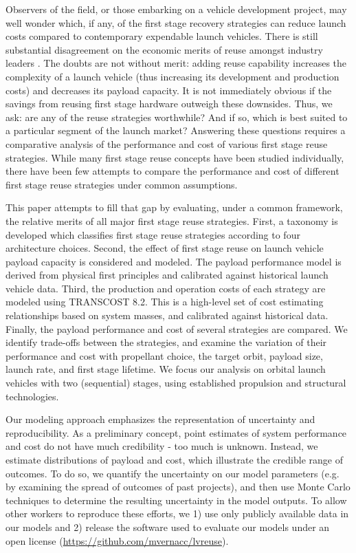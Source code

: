 \documentclass[conf]{new-aiaa}
\begin{document}
\begin{multicols}{2}
Observers of the field, or those embarking on a vehicle development project, may well wonder which, if any, of the first stage recovery strategies can reduce launch costs compared to contemporary expendable launch vehicles. There is still substantial disagreement on the economic merits of reuse amongst industry leaders \cite{Cantrell17, Russell18, Selding16_orbital, Wall15, Selding16_spacex}. The doubts are not without merit: adding reuse capability increases the complexity of a launch vehicle (thus increasing its development and production costs) and decreases its payload capacity. It is not immediately obvious if the savings from reusing first stage hardware outweigh these downsides. Thus, we ask: are any of the reuse strategies worthwhile? And if so, which is best suited to a particular segment of the launch market? Answering these questions requires a comparative analysis of the performance and cost of various first stage reuse strategies. While many first stage reuse concepts have been studied individually, there have been few attempts to compare the performance and cost of different first stage reuse strategies under common assumptions.

This paper attempts to fill that gap by evaluating, under a common framework, the relative merits of all major first stage reuse strategies. First, a taxonomy is developed which classifies first stage reuse strategies according to four architecture choices. Second, the effect of first stage reuse on launch vehicle payload capacity is considered and modeled. The payload performance model is derived from physical first principles and calibrated against historical launch vehicle data. Third, the production and operation costs of each strategy are modeled using TRANSCOST 8.2. This is a high-level set of cost estimating relationships based on system masses, and calibrated against historical data. Finally, the payload performance and cost of several strategies are compared. We identify trade-offs between the strategies, and examine the variation of their performance and cost with propellant choice, the target orbit, payload size, launch rate, and first stage lifetime. We focus our analysis on orbital launch vehicles with two (sequential) stages, using established propulsion and structural technologies.

Our modeling approach emphasizes the representation of uncertainty and reproducibility. As a preliminary concept, point estimates of system performance and cost do not have much credibility - too much is unknown. Instead, we estimate distributions of payload and cost, which illustrate the credible range of outcomes. To do so, we quantify the uncertainty on our model parameters (e.g. by examining the spread of outcomes of past projects), and then use Monte Carlo techniques to determine the resulting uncertainty in the model outputs. To allow other workers to reproduce these efforts, we 1) use only publicly available data in our models and 2) release the software used to evaluate our models under an open license (\url{https://github.com/mvernacc/lvreuse}).


\end{multicols}
\end{document}
